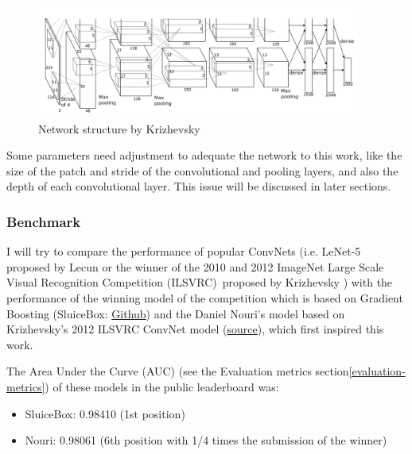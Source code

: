 \documentclass[]{article}
\newcommand{\imagenet}{ImageNet Large Scale Visual Recognition Competition (ILSVRC)}
\begin{document}
\begin{figure}[htpb!]
\centering
\includegraphics[width= 0.95\textwidth]{images/imagenet12}
\caption{Network structure by Krizhevsky \cite{Krizhevsky12} \label{img:imagenet12}}
\end{figure}

Some parameters need adjustment to adequate the network to this work, like the size of the patch and stride of the convolutional and pooling layers, and also the depth of each convolutional layer. This issue will be discussed in later sections.

\subsubsection{Benchmark}\label{benchmark}

I will try to compare the performance of popular ConvNets (i.e. LeNet-5 proposed by Lecun \cite{Lecun98} or the winner of the 2010 and 2012 \imagenet \, proposed by Krizhevsky \cite{Krizhevsky12}) with the performance of the winning model of the competition which is based on Gradient Boosting (SluiceBox: \href{https://github.com/nmkridler/moby}{Github}) and the Daniel Nouri's model based on Krizhevsky's 2012 ILSVRC ConvNet model \cite{Krizhevsky12} (\href{https://speakerdeck.com/dnouri/practical-deep-neural-nets-for-detecting-marine-mammals/}{source}), which first inspired this work.

The Area Under the Curve (AUC) (see the Evaluation metrics section\ref{evaluation-metrics}) of these models in the public leaderboard was:
\begin{itemize}
	\item SluiceBox: 0.98410 (1st position)
	\item Nouri: 0.98061 (6th position with 1/4 times the submission of the winner)
\end{itemize}
\end{document}
